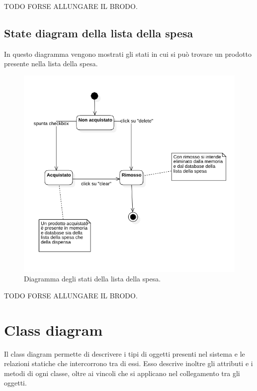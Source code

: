 TODO FORSE ALLUNGARE IL BRODO.

\newpage

\subsection{State diagram della lista della spesa}

In questo diagramma vengono mostrati gli stati in cui si può trovare un prodotto presente nella lista della spesa.

\begin{figure}[H]
    \includegraphics[width=\linewidth]{images/state-shopping-list.png}
    \caption{Diagramma degli stati della lista della spesa.}
    \label{fig:stateshoplist}
\end{figure}

TODO FORSE ALLUNGARE IL BRODO.

\newpage

\section{Class diagram}

Il class diagram permette di descrivere i tipi di oggetti presenti nel sistema e le relazioni statiche che intercorrono tra di essi. Esso descrive inoltre gli attributi e i metodi di ogni classe, oltre ai vincoli che si applicano nel collegamento tra gli oggetti.

